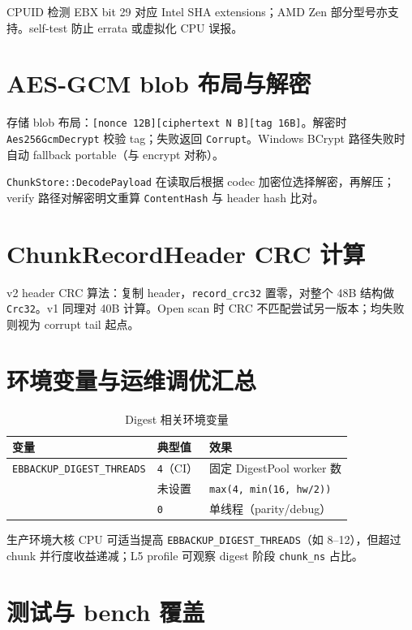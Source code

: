 CPUID 检测 EBX bit 29 对应 Intel SHA extensions；AMD Zen 部分型号亦支持。self-test 防止 errata 或虚拟化 CPU 误报。

\section{AES-GCM blob 布局与解密}

存储 blob 布局：\texttt{[nonce 12B][ciphertext N B][tag 16B]}。解密时 \texttt{Aes256GcmDecrypt} 校验 tag；失败返回 \texttt{Corrupt}。Windows BCrypt 路径失败时自动 fallback portable（与 encrypt 对称）。

\texttt{ChunkStore::DecodePayload} 在读取后根据 codec 加密位选择解密，再解压；verify 路径对解密明文重算 \texttt{ContentHash} 与 header hash 比对。

\section{ChunkRecordHeader CRC 计算}

v2 header CRC 算法：复制 header，\texttt{record\_crc32} 置零，对整个 48B 结构做 \texttt{Crc32}。v1 同理对 40B 计算。Open scan 时 CRC 不匹配尝试另一版本；均失败则视为 corrupt tail 起点。

\section{环境变量与运维调优汇总}

\begin{table}[htbp]
\centering
\caption{Digest 相关环境变量}
\begin{tabular}{@{}llp{6cm}@{}}
\toprule
变量 & 典型值 & 效果 \\
\midrule
\texttt{EBBACKUP\_DIGEST\_THREADS} & \texttt{4}（CI） & 固定 DigestPool worker 数 \\
 & 未设置 & \texttt{max(4, min(16, hw/2))} \\
 & \texttt{0} & 单线程（parity/debug） \\
\bottomrule
\end{tabular}
\end{table}

生产环境大核 CPU 可适当提高 \texttt{EBBACKUP\_DIGEST\_THREADS}（如 8--12），但超过 chunk 并行度收益递减；L5 profile 可观察 digest 阶段 \texttt{chunk\_ns} 占比。

\section{测试与 bench 覆盖}


